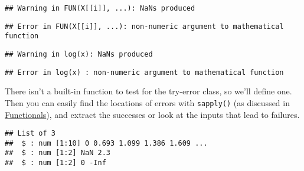 \begin{verbatim}
## Warning in FUN(X[[i]], ...): NaNs produced
\end{verbatim}

\begin{verbatim}
## Error in FUN(X[[i]], ...): non-numeric argument to mathematical function
\end{verbatim}

\begin{Shaded}
\begin{Highlighting}[]
\StringTok{ }\NormalTok{(}
\end{Highlighting}
\end{Shaded}

\begin{verbatim}
## Warning in log(x): NaNs produced
\end{verbatim}

\begin{verbatim}
## Error in log(x) : non-numeric argument to mathematical function
\end{verbatim}

There isn't a built-in function to test for the try-error class, so
we'll define one. Then you can easily find the locations of errors with
\texttt{sapply()} (as discussed in
\protect\hyperlink{functionals}{Functionals}), and extract the successes
or look at the inputs that lead to failures.

\begin{Shaded}
\begin{Highlighting}[]
\StringTok{ }\NormalTok{)}
\StringTok{ }\OperatorTok{!}\NormalTok{(}\NormalTok{))}

\end{Highlighting}
\end{Shaded}

\begin{verbatim}
## List of 3
##  $ : num [1:10] 0 0.693 1.099 1.386 1.609 ...
##  $ : num [1:2] NaN 2.3
##  $ : num [1:2] 0 -Inf
\end{verbatim}


